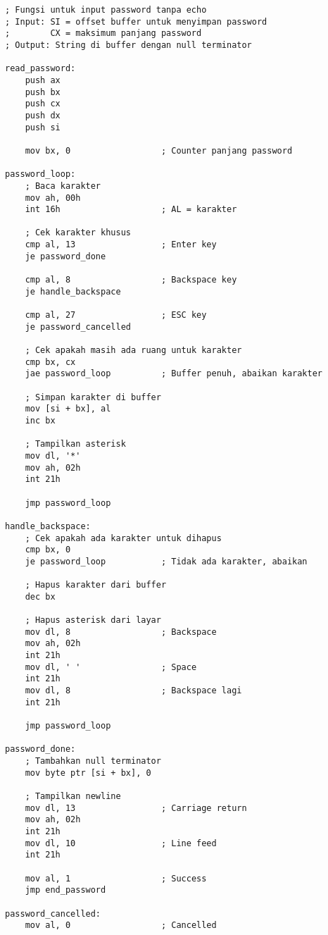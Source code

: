 \documentclass[../main.tex]{subfiles}
\begin{document}
\begin{lstlisting}[language={[x86masm]Assembler}, caption=Input Password tanpa Echo, label={lst:password-input}]
; Fungsi untuk input password tanpa echo
; Input: SI = offset buffer untuk menyimpan password
;        CX = maksimum panjang password
; Output: String di buffer dengan null terminator

read_password:
    push ax
    push bx
    push cx
    push dx
    push si
    
    mov bx, 0                  ; Counter panjang password
    
password_loop:
    ; Baca karakter
    mov ah, 00h
    int 16h                    ; AL = karakter
    
    ; Cek karakter khusus
    cmp al, 13                 ; Enter key
    je password_done
    
    cmp al, 8                  ; Backspace key
    je handle_backspace
    
    cmp al, 27                 ; ESC key
    je password_cancelled
    
    ; Cek apakah masih ada ruang untuk karakter
    cmp bx, cx
    jae password_loop          ; Buffer penuh, abaikan karakter
    
    ; Simpan karakter di buffer
    mov [si + bx], al
    inc bx
    
    ; Tampilkan asterisk
    mov dl, '*'
    mov ah, 02h
    int 21h
    
    jmp password_loop
    
handle_backspace:
    ; Cek apakah ada karakter untuk dihapus
    cmp bx, 0
    je password_loop           ; Tidak ada karakter, abaikan
    
    ; Hapus karakter dari buffer
    dec bx
    
    ; Hapus asterisk dari layar
    mov dl, 8                  ; Backspace
    mov ah, 02h
    int 21h
    mov dl, ' '                ; Space
    int 21h
    mov dl, 8                  ; Backspace lagi
    int 21h
    
    jmp password_loop
    
password_done:
    ; Tambahkan null terminator
    mov byte ptr [si + bx], 0
    
    ; Tampilkan newline
    mov dl, 13                 ; Carriage return
    mov ah, 02h
    int 21h
    mov dl, 10                 ; Line feed
    int 21h
    
    mov al, 1                  ; Success
    jmp end_password
    
password_cancelled:
    mov al, 0                  ; Cancelled
    

\end{lstlisting}
\end{document}
